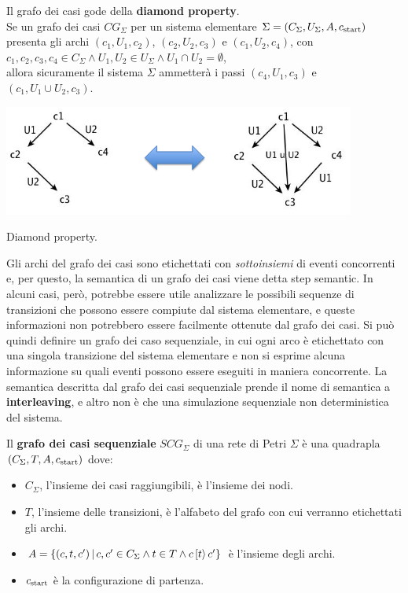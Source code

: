 \begin{property}
    Il grafo dei casi gode della \textbf{diamond property}.\\
    Se un grafo dei casi $CG_{\Sigma}$ per un sistema elementare
    $\Sigma = (C_{\Sigma}, U_{\Sigma}, A, c_{\textnormal{start}})$ presenta gli archi
    $(c_1, U_1, c_2)$, $(c_2, U_2, c_3)$ e $(c_1, U_2, c_4)$, con
    $c_1, c_2, c_3, c_4 \in C_{\Sigma} \land U_1, U_2 \in U_{\Sigma} \land
    U_1 \cap U_2 = \emptyset$,\\
    allora sicuramente il sistema $\Sigma$ ammetterà i passi
    $(c_4, U_1, c_3)$ e $(c_1, U_1 \cup U_2, c_3)$.
    \begin{marginfigure}[1cm]
        \includegraphics[width=1.05\linewidth]{img/diamond_property.png}
        \caption{Diamond property.}
        \label{fig:diamond_property}
    \end{marginfigure}
\end{property}

Gli archi del grafo dei casi sono etichettati
con \textit{sottoinsiemi} di eventi concorrenti e, per questo, la
semantica di un grafo dei casi viene detta step semantic.
In alcuni casi, però, potrebbe essere utile analizzare le possibili
sequenze di transizioni che possono essere compiute dal sistema elementare,
e queste informazioni non potrebbero essere facilmente ottenute dal grafo
dei casi.
Si può quindi definire un grafo dei caso sequenziale, in cui ogni arco è etichettato
con una singola transizione del sistema elementare e non si esprime alcuna
informazione su quali eventi possono essere eseguiti in maniera concorrente.
La semantica descritta dal grafo dei casi sequenziale prende il nome
di semantica a \textbf{interleaving}, e altro non è
che una simulazione sequenziale non deterministica del sistema.

\begin{defn}
    Il \textbf{grafo dei casi sequenziale} $SCG_{\Sigma}$ di una rete
    di Petri $\Sigma$ è una quadrapla $(C_{\Sigma}, T, A, c_{\textnormal{start}})$
    dove:
    \begin{itemize}
        \item $C_{\Sigma}$, l'insieme dei casi raggiungibili, è l'insieme dei
        nodi.
        \item $T$, l'insieme delle transizioni, è l'alfabeto del grafo con cui
        verranno etichettati gli archi.
        \item $A = \left\{(c, t, c') \, | \, c, c' \in C_{\Sigma} \land
        t \in T \land c\,[t\rangle\,c'\right\}$
        è l'insieme degli archi.
        \item $c_{\textnormal{start}}$ è la configurazione di partenza.
    \end{itemize}
\end{defn}

